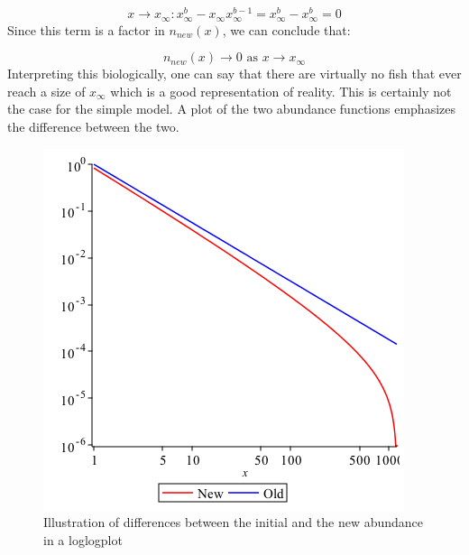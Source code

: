 \documentclass{article}
\numberwithin{equation}{section} %
\begin{document}
\begin{equation}
    x\rightarrow x_\infty: x_\infty^b-x_\infty x_\infty^{b-1}=x_{\infty}^b-x_{\infty}^b=0
\end{equation}
Since this term is a factor in $n_{new}(x)$, we can conclude that:

\begin{equation}
    n_{new}(x)\rightarrow0 \textrm{ as } x\rightarrow x_\infty
\end{equation}
Interpreting this biologically, one can say that there are virtually no fish that ever reach a size of $x_\infty$ which is a good representation of reality. This is certainly not the case for the simple model. A plot of the two abundance functions emphasizes the difference between the two.

\begin{figure}[h!]
\centering
\includegraphics[width=.6\textwidth]{exercises/ex6p3}
	\caption{Illustration of differences between the initial and the new abundance in a loglogplot}
	\label{fig:ex6p3}
\end{figure}\\


\cleardoublepage

\appendix
\end{document}

